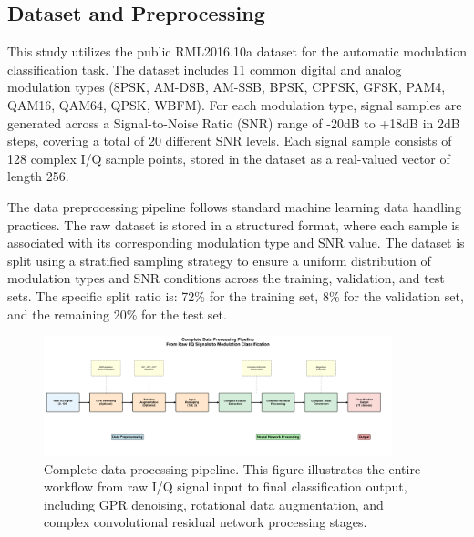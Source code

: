 \documentclass[conference]{IEEEtran}
\begin{document}
\subsection{Dataset and Preprocessing}

This study utilizes the public RML2016.10a dataset for the automatic modulation classification task. The dataset includes 11 common digital and analog modulation types (8PSK, AM-DSB, AM-SSB, BPSK, CPFSK, GFSK, PAM4, QAM16, QAM64, QPSK, WBFM). For each modulation type, signal samples are generated across a Signal-to-Noise Ratio (SNR) range of -20dB to +18dB in 2dB steps, covering a total of 20 different SNR levels. Each signal sample consists of 128 complex I/Q sample points, stored in the dataset as a real-valued vector of length 256.

The data preprocessing pipeline follows standard machine learning data handling practices. The raw dataset is stored in a structured format, where each sample is associated with its corresponding modulation type and SNR value. The dataset is split using a stratified sampling strategy to ensure a uniform distribution of modulation types and SNR conditions across the training, validation, and test sets. The specific split ratio is: 72\% for the training set, 8\% for the validation set, and the remaining 20\% for the test set.


\begin{figure}[htbp]
\centering
\includegraphics[width=0.9\textwidth]{figure/data_processing_pipeline.png}
\caption{Complete data processing pipeline. This figure illustrates the entire workflow from raw I/Q signal input to final classification output, including GPR denoising, rotational data augmentation, and complex convolutional residual network processing stages.}
\label{fig:data_pipeline}
\end{figure}
\end{document}
